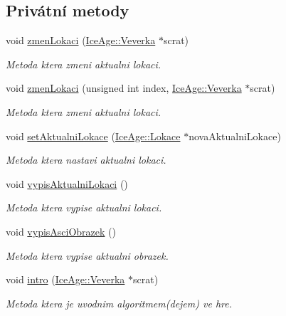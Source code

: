 \subsection*{Privátní metody}
\begin{DoxyCompactItemize}
\item 
void \hyperlink{classIceAge_1_1Hra_a9429d4476f187d8a80dde5944704fab7}{zmen\+Lokaci} (\hyperlink{classIceAge_1_1Veverka}{Ice\+Age\+::\+Veverka} $\ast$scrat)
\begin{DoxyCompactList}\small\item\em Metoda ktera zmeni aktualni lokaci. \end{DoxyCompactList}\item 
void \hyperlink{classIceAge_1_1Hra_ab22ae41ab25a957787cc5f11569e20f7}{zmen\+Lokaci} (unsigned int index, \hyperlink{classIceAge_1_1Veverka}{Ice\+Age\+::\+Veverka} $\ast$scrat)
\begin{DoxyCompactList}\small\item\em Metoda ktera zmeni aktualni lokaci. \end{DoxyCompactList}\item 
void \hyperlink{classIceAge_1_1Hra_a1fad6152ce71d1e2912e538f3c330d29}{set\+Aktualni\+Lokace} (\hyperlink{classIceAge_1_1Lokace}{Ice\+Age\+::\+Lokace} $\ast$nova\+Aktualni\+Lokace)
\begin{DoxyCompactList}\small\item\em Metoda ktera nastavi aktualni lokaci. \end{DoxyCompactList}\item 
void \hyperlink{classIceAge_1_1Hra_af0fafa4884c5107939edc907cc7de1a9}{vypis\+Aktualni\+Lokaci} ()
\begin{DoxyCompactList}\small\item\em Metoda ktera vypise aktualni lokaci. \end{DoxyCompactList}\item 
void \hyperlink{classIceAge_1_1Hra_a28f302456724c7a0901e16a940ea6c67}{vypis\+Asci\+Obrazek} ()
\begin{DoxyCompactList}\small\item\em Metoda ktera vypise aktualni obrazek. \end{DoxyCompactList}\item 
void \hyperlink{classIceAge_1_1Hra_acca9aa3823d78712b66e371fabbaf351}{intro} (\hyperlink{classIceAge_1_1Veverka}{Ice\+Age\+::\+Veverka} $\ast$scrat)
\begin{DoxyCompactList}\small\item\em Metoda ktera je uvodnim algoritmem(dejem) ve hre. \end{DoxyCompactList}\end{DoxyCompactItemize}

